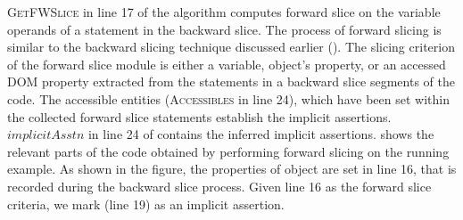 \textsc{GetFWSlice} in line 17 of the algorithm computes forward slice on the variable operands of a statement in the backward slice.
The process of forward slicing is similar to the backward slicing technique discussed earlier (). The slicing criterion of the forward slice module is either a variable, object's property, or an accessed DOM property extracted from the statements in a backward slice segments of the code. The accessible entities (\textsc{Accessibles} in line 24), which have been set within the collected forward slice statements establish the implicit assertions.
$implicitAsstn$ in line 24 of  contains the inferred implicit assertions.
 shows the relevant parts of the code obtained by performing forward slicing on the running example. 
As shown in the figure, the properties of object  are set in line 16, that is recorded during the backward slice process. Given line 16 as the forward slice criteria, we mark  (line 19) as an implicit assertion.        